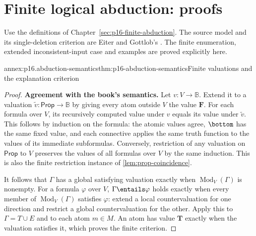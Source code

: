 \section{Finite logical abduction: proofs}
\label{sec:annex-p16-finite-abduction}

Use the definitions of Chapter~\ref{sec:p16-finite-abduction}. The source
model and its single-deletion criterion are Eiter and Gottlob's
\cite[sec.~2, manuscript pp.~9--11]{EiterGottlobAbductionManuscript}.
The finite enumeration, extended inconsistent-input case and examples are
proved explicitly here.

\begin{annexitem}{annex:p16.abduction-semantics}{thm:p16-abduction-semantics}{Finite valuations and the explanation criterion}
\begin{proof}
\textbf{Agreement with the book's semantics.}\enspace
Let \(v:V\to\mathbb{B}\). Extend it to a valuation
\(\widetilde v:\mathsf{Prop}\to\mathbb{B}\) by giving every atom outside \(V\)
the value \(\mathbf{F}\). For each formula over \(V\), its recursively
computed value under \(v\) equals its value under \(\widetilde v\).
This follows by induction on the formula: the atomic values agree,
\(\bottom\) has the same fixed value, and each connective applies the
same truth function to the values of its immediate subformulas. Conversely,
restriction of any valuation on \(\mathsf{Prop}\) to \(V\) preserves the
values of all formulas over \(V\) by the same induction. This is also
the finite restriction instance of \cref{lem:prop-coincidence}.

It follows that \(\Gamma\) has a global satisfying valuation exactly
when \(\operatorname{Mod}_V(\Gamma)\) is nonempty. For a formula
\(\varphi\) over \(V\), \(\Gamma\entails\varphi\) holds
exactly when every member of \(\operatorname{Mod}_V(\Gamma)\)
satisfies \(\varphi\): extend a local countervaluation for one
direction and restrict a global countervaluation for the other. Apply
this to \(\Gamma=T\cup E\) and to each atom \(m\in M\).
An atom has value \(\mathbf{T}\) exactly when the valuation satisfies it,
which proves the finite criterion.


\end{proof}
\end{annexitem}
